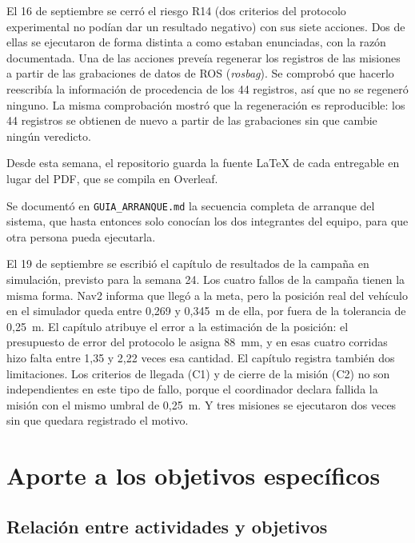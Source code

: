 \documentclass[12pt,letterpaper]{article}
\begin{document}
El 16 de septiembre se cerró el riesgo R14 (dos criterios del protocolo experimental no podían dar un resultado negativo) con sus siete acciones. Dos de ellas se ejecutaron de forma distinta a como estaban enunciadas, con la razón documentada. Una de las acciones preveía regenerar los registros de las misiones a partir de las grabaciones de datos de ROS (\textit{rosbag}). Se comprobó que hacerlo reescribía la información de procedencia de los 44 registros, así que no se regeneró ninguno. La misma comprobación mostró que la regeneración es reproducible: los 44 registros se obtienen de nuevo a partir de las grabaciones sin que cambie ningún veredicto.

Desde esta semana, el repositorio guarda la fuente LaTeX de cada entregable en lugar del PDF, que se compila en Overleaf.

Se documentó en \texttt{GUIA\_ARRANQUE.md} la secuencia completa de arranque del sistema, que hasta entonces solo conocían los dos integrantes del equipo, para que otra persona pueda ejecutarla.

El 19 de septiembre se escribió el capítulo de resultados de la campaña en simulación, previsto para la semana 24. Los cuatro fallos de la campaña tienen la misma forma. Nav2 informa que llegó a la meta, pero la posición real del vehículo en el simulador queda entre 0,269 y 0,345~m de ella, por fuera de la tolerancia de 0,25~m. El capítulo atribuye el error a la estimación de la posición: el presupuesto de error del protocolo le asigna 88~mm, y en esas cuatro corridas hizo falta entre 1,35 y 2,22 veces esa cantidad. El capítulo registra también dos limitaciones. Los criterios de llegada (C1) y de cierre de la misión (C2) no son independientes en este tipo de fallo, porque el coordinador declara fallida la misión con el mismo umbral de 0,25~m. Y tres misiones se ejecutaron dos veces sin que quedara registrado el motivo.

\section{Aporte a los objetivos específicos}
\label{sec:aporte}

\subsection{Relación entre actividades y objetivos}
\end{document}
